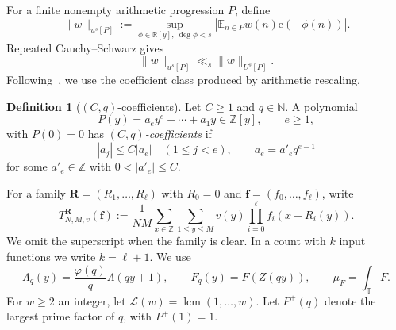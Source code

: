 \documentclass[12pt]{amsart}
\newcommand{\Z}{\mathbb Z}
\newcommand{\1}{\mathbf 1}
\newcommand{\e}{\mathrm e}
\theoremstyle{definition}
\newtheorem{definition}[theorem]{Definition}
\begin{document}
For a finite nonempty arithmetic progression \(P\), define
\begin{equation}\label{e:u-def}
 \|w\|_{u^s[P]}:=\sup_{\phi\in\mathbb R[y],\ \deg\phi<s}
 \left|\mathbb E_{n\in P}w(n)\e(-\phi(n))\right|.
\end{equation}
Repeated Cauchy--Schwarz gives
\begin{equation}\label{e:u-below-U}
 \|w\|_{u^s[P]}\ll_s\|w\|_{U^s[P]}.
\end{equation}
Following~\cite[Definition~2.3]{ShaoWang}, we use the coefficient class
produced by arithmetic rescaling.

\begin{definition}[$(C,q)$-coefficients]\label{d:Cq}
Let $C\ge1$ and $q\in\mathbb N$.  A polynomial
\[
 P(y)=a_ey^e+\cdots+a_1y\in\Z[y],\qquad e\ge1,
\]
with $P(0)=0$ has \emph{$(C,q)$-coefficients} if
\[
 |a_j|\le C|a_e|\quad(1\le j<e),
 \qquad a_e=a'_eq^{e-1}
\]
for some $a'_e\in\Z$ with $0<|a'_e|\le C$.
\end{definition}

For a family $\mathbf R=(R_1,\ldots,R_\ell)$ with $R_0=0$ and
$\mathbf f=(f_0,\ldots,f_\ell)$, write
\begin{equation}\label{e:Tdef}
 T_{N,M,v}^{\mathbf R}(\mathbf f)
 :=\frac1{NM}\sum_{x\in\mathbb Z}\sum_{1\le y\le M}
 v(y)\prod_{i=0}^\ell f_i(x+R_i(y)).
\end{equation}
We omit the superscript when the family is clear. In a count with
$k$ input functions we write $k=\ell+1$. We use
\[
 \Lambda_q(y)=\frac{\varphi(q)}q\Lambda(qy+1),\qquad
 F_q(y)=F(Z(qy)),\qquad \mu_F=\int_{\mathbb T}F.
\]
For $w\ge2$ an integer, let $\mathcal L(w)=\operatorname{lcm}(1,\ldots,w)$.
Let $P^+(q)$ denote the largest prime factor of $q$, with $P^+(1)=1$.

\end{document}
